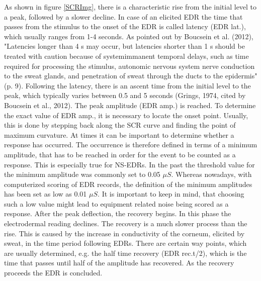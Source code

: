 As shown in figure \ref{SCRImg}, there is a characteristic rise from the initial level to a peak, followed by a slower decline. In case of an elicited EDR the time that passes from the stimulus to the onset of the EDR is called latency (EDR lat.), which usually ranges from 1-4 seconds. As pointed out by Boucsein et al. (2012), "Latencies longer than 4 s may occur, but latencies shorter than 1 s should be treated with caution because of systemimmanent temporal delays, such as time required for processing the stimulus, autonomic nervous system nerve conduction to the sweat glands, and penetration of sweat through the ducts to the epidermis"(p. 9). Following the latency, there is an ascent time from the initial level to the peak, which typically varies between 0.5 and 5 seconds (Grings, 1974, cited by Boucsein et al., 2012). The peak amplitude (EDR amp.) is reached. To determine the exact value of EDR amp., it is necessary to locate the onset point. Usually, this is done by stepping back along the SCR curve and finding the point of maximum curvature.
At times it can be important to determine whether a response has occurred. The occurrence is therefore defined in terms of a minimum amplitude, that has to be reached in order for the event to be counted as a response. This is especially true for NS-EDRs. In the past the threshold value for the minimum amplitude was commonly set to 0.05 $\mu S$. Whereas nowadays, with computerized scoring of EDR records, the definition of the minimum amplitudes has been set as low as 0.01 $\mu S$. It is important to keep in mind, that choosing such a low value might lead to equipment related noise being scored as a response. After the peak deflection, the recovery begins. In this phase the electrodermal reading declines. The recovery is a much slower process than the rise. This is caused by the increase in conductivity of the corneum, elicited by sweat, in the time period following EDRs. There are certain way points, which are usually determined, e.g. the half time recovery (EDR rec.t/2), which is the time that passes until half of the amplitude has recovered. As the recovery proceeds the EDR is concluded.

